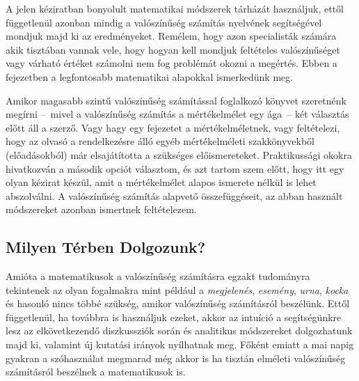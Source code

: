 \documentclass{article}
\begin{document}
A jelen kéziratban bonyolult matematikai módszerek tárházát használjuk, ettől függetlenül azonban mindig a valószínűség számítás nyelvének segítségével mondjuk majd ki az eredményeket. Remélem, hogy azon specialisták számára akik tisztában vannak vele, hogy hogyan kell mondjuk feltételes valószínűséget vagy várható értéket számolni nem fog problémát okozni a megértés. Ebben a fejezetben a legfontosabb matematikai alapokkal ismerkedünk meg. 

Amikor magasabb szintű valószínűség számítással foglalkozó könyvet szeretnénk megírni --~mivel a valószínűség számítás a mértékelmélet egy ága~-- két választás előtt áll a szerző. Vagy hagy egy fejezetet a mértékelméletnek, vagy feltételezi, hogy az olvasó a rendelkezésre álló egyéb mértékelméleti szakkönyvekből (előadásokból) már elsajátította a szükséges előismereteket. Praktikussági okokra hivatkozván a második opciót választom, és azt tartom szem előtt, hogy itt egy olyan kézirat készül, amit a mértékelmélet alapos ismerete nélkül is lehet abszolválni. A valószínűség számítás alapvető összefüggéseit, az abban használt módszereket azonban ismertnek feltételezem.

\subsection{Milyen Térben Dolgozunk?}\label{lab:ter}

Amióta a matematikusok a valószínűség számításra egzakt tudományra tekintenek az olyan fogalmakra mint például a \textit{megjelenés}, \textit{esemény}, \textit{urna}, \textit{kocka} és hasonló nincs többé szükség, amikor valószínűség számításról beszélünk. Ettől függetlenül, ha továbbra is használjuk ezeket, akkor az intuíció a segítségünkre lesz az elkövetkezendő diszkussziók során és analitikus módszereket dolgozhatunk majd ki, valamint új kutatási irányok nyílhatnak meg. Főként emiatt a mai napig gyakran a szóhasználat megmarad még akkor is ha tisztán elméleti valószínűség számításról beszélnek a matematikusok is.
\end{document}
